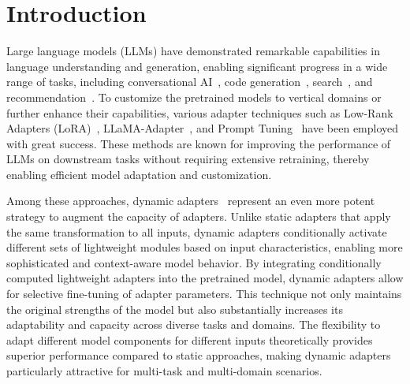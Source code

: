 \section{Introduction}



Large language models (LLMs) have demonstrated remarkable capabilities in language understanding and generation, enabling significant progress in a wide range of tasks, including conversational AI~\cite{li2025towards,chen2025multi,li2023coltr,li2025fultr,wei2025igniting}, code generation~\cite{xiong2024search,wang2024enhancing}, search~\cite{li2025m,liao2023mcrle,li2025rankexpert,li2025s,li2025rankelectra}, and recommendation~\cite{li2023mhrr,li2023ltrgcn,lu2025dmmd4sr,cui2025multi,cui2025diffusion,liu2025mdn,mo2025one}. To customize the pretrained models to vertical domains or further enhance their capabilities, various adapter techniques such as Low-Rank Adapters (LoRA)~\cite{Hu2021LoRALA}, LLaMA-Adapter~\cite{zhang2023llama}, and Prompt Tuning~\cite{lester2021power,li2023s2phere,tong2025dapt,liao2024tpo} have been employed with great success. These methods are known for improving the performance of LLMs on downstream tasks without requiring extensive retraining, thereby enabling efficient model adaptation and customization.

Among these approaches, dynamic adapters~\cite{feng2024mixtureofloras,gou2024mixture,luo2024moelora} represent an even more potent strategy to augment the capacity of adapters. Unlike static adapters that apply the same transformation to all inputs, dynamic adapters conditionally activate different sets of lightweight modules based on input characteristics, enabling more sophisticated and context-aware model behavior.
By integrating conditionally computed lightweight adapters into the pretrained model, dynamic adapters allow for selective fine-tuning of adapter parameters.
This technique not only maintains the original strengths of the model but also substantially increases its adaptability and capacity across diverse tasks and domains. The flexibility to adapt different model components for different inputs theoretically provides superior performance compared to static approaches, making dynamic adapters particularly attractive for multi-task and multi-domain scenarios.

